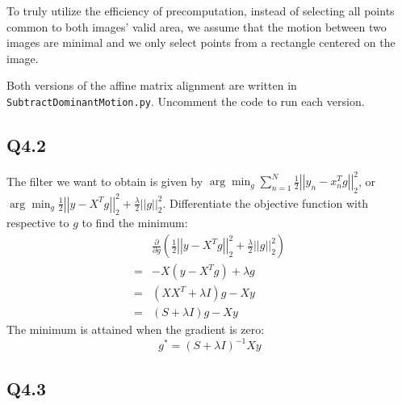 \documentclass{article} %
\begin{document}
    To truly utilize the efficiency of precomputation, instead of selecting all points common to both images' valid area, we assume that the motion between two images are minimal and we only select points from a rectangle centered on the image. 
    \medskip
    
    Both versions of the affine matrix alignment are written in \verb|SubtractDominantMotion.py|. Uncomment the code to run each version. 

    \subsection*{Q4.2}

    The filter we want to obtain is given by $\displaystyle\arg \min _{g} {\sum }_{n=1}^{N}\frac{1}{2}{\left| \left| y_{n}-{x}_{n}^{T}g\right| \right| }_{2}^{2}$, or $\displaystyle\arg \min _{g} \frac{1}{2}{\left| \left| y-X^{T}g\right| \right| }_{2}^{2}+\frac{\lambda }{2}{\left| \left| g\right| \right| }_{2}^{2}$. Differentiate the objective function with respective to $g$ to find the minimum:
    \begin{align*}
    &\frac{\partial }{\partial g}\left(\frac{1}{2}{\left| \left| y-X^{T}g\right| \right| }_{2}^{2}+\frac{\lambda }{2}{\left| \left| g\right| \right| }_{2}^{2}\right)\\ =&-X\left(y-X^{T}g\right)+\lambda g\\ =&\left(XX^{T}+\lambda I\right)g-Xy\\ =&\left(S+\lambda I\right)g-Xy
    \end{align*}
    The minimum is attained when the gradient is zero:
    \begin{equation*}
    g^*=\left(S+\lambda I\right)^{-1}Xy
    \end{equation*}

    \subsection*{Q4.3}
\end{document}
